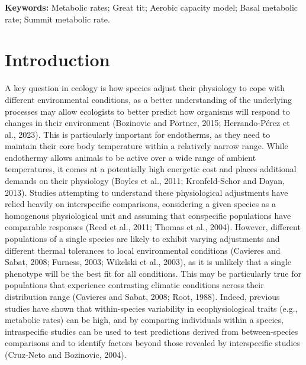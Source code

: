 \documentclass[10pt, twoside]{book} %
\begin{document}
\vspace*{\fill}
\noindent \textbf{Keywords:} Metabolic rates; Great tit; Aerobic capacity model; Basal metabolic rate; Summit metabolic rate.

\section{Introduction}

A key question in ecology is how species adjust their physiology to cope with different environmental conditions, as a better understanding of the underlying processes may allow ecologists to better predict how organisms will respond to changes in their environment (Bozinovic and Pörtner, 2015; Herrando-Pérez et al., 2023). This is particularly important for endotherms, as they need to maintain their core body temperature within a relatively narrow range. While endothermy allows animals to be active over a wide range of ambient temperatures, it comes at a potentially high energetic cost and places additional demands on their physiology (Boyles et al., 2011; Kronfeld-Schor and Dayan, 2013). Studies attempting to understand these physiological adjustments have relied heavily on interspecific comparisons, considering a given species as a homogenous physiological unit and assuming that conspecific populations have comparable responses (Reed et al., 2011; Thomas et al., 2004). However, different populations of a single species are likely to exhibit varying adjustments and different thermal tolerances to local environmental conditions (Cavieres and Sabat, 2008; Furness, 2003; Wikelski et al., 2003), as it is unlikely that a single phenotype will be the best fit for all conditions. This may be particularly true for populations that experience contrasting climatic conditions across their distribution range (Cavieres and Sabat, 2008; Root, 1988). Indeed, previous studies have shown that within-species variability in ecophysiological traits (e.g., metabolic rates) can be high, and by comparing individuals within a species, intraspecific studies can be used to test predictions derived from between-species comparisons and to identify factors beyond those revealed by interspecific studies (Cruz‐Neto and Bozinovic, 2004).\\
\end{document}
